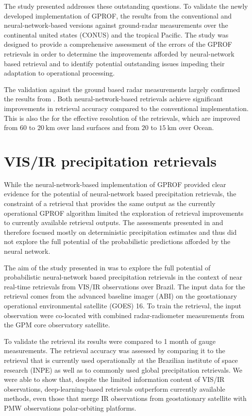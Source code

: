 The study presented \citet{pfreundschuh22c} addresses these outstanding
questions. To validate the newly developed implementation of GPROF, the results
from the conventional and neural-network-based versions against ground-radar
measurements over the continental united states (CONUS) and the tropical
Pacific. The study was designed to provide a comprehensive assessment of the
errors of the GPROF retrievals in order to determine the improvements afforded
by neural-network based retrieval and to identify potential outstanding issues
impeding their adaptation to operational processing.

The validation against the ground based radar measurements largely confirmed the
results from \citet{pfreundschuh22}. Both neural-network-based retrievals
achieve significant improvements in retrieval accuracy compared to the
conventional implementation. This is also the for the effective resolution of
the retrievals, which are improved from $60$ to $\SI{20}{\kilo \meter}$ over
land surfaces and from $20$ to $\SI{15}{\kilo \meter}$ over Ocean.

\section{VIS/IR precipitation retrievals}

While the neural-network-based implementation of GPROF provided clear evidence
for the potential of neural-network based precipitation retrievals, the
constraint of a retrieval that provides the same output as the currently
operational GPROF algorithm limited the exploration of retrieval improvements to
currently available retrieval outputs. The assessments presented in
\citet{pfreundschuh22} and \citet{pfreundschuh22c} therefore focused mostly on
deterministic precipitation estimates and thus did not explore the full
potential of the probabilistic predictions afforded by the neural network.

The aim of the study presented in \citet{pfreundschuh22b} was to explore the
full potential of probabilistic neural-network based precipitation retrievals in
the context of near real-time retrievals from VIS/IR observations over Brazil.
The input data for the retrieval comes from the advanced baseline imager (ABI)
on the geostationary operational environmental satellite (GOES) 16. To train the
retrieval, the input observation were co-located with combined radar-radiometer
measurements from the GPM core observatory satellite.

To validate the retrieval its results were compared to 1 month of gauge
measurements. The retrieval accuracy was assessed by comparing it to the
retrieval that is currently used operationally at the Brazilian institute of
space research (INPE) as well as to commonly used global precipitation
retrievals. We were able to show that, despite the limited information content
of VIS/IR observations, deep-learning-based retrievals outperform currently
available methods, even those that merge IR observations from geostationary
satellite with PMW observations polar-orbiting platforms.

